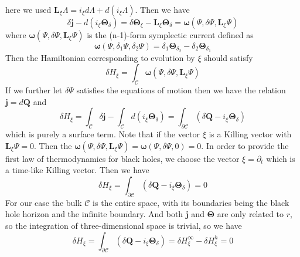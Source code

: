 \documentclass[a4paper,12pt]{article}
\numberwithin{equation}{section}
\begin{document}
\begin{appendix}
\begin{equation}
\end{equation}
here we used $\mathbf{L}_\xi \Lambda=i_\xi d\Lambda+d\left(i_\xi \Lambda\right)$. Then we have 
\begin{equation}
    \delta \mathbf{j}-d\left(i_\xi \mathbf{\Theta}_\delta\right)=\delta \mathbf{\Theta}_\xi -\mathbf{L}_\xi \mathbf{\Theta}_\delta=\mathbf{\omega}(\Psi,\delta\Psi,\mathbf{L}_\xi \Psi)
\end{equation}
where $\mathbf{\omega}(\Psi,\delta\Psi,\mathbf{L}_\xi \Psi)$ is the (n-1)-form symplectic current defined as \cite{Wald:1993nt,Iyer:1994ys}
\begin{equation}
    \mathbf{\omega}(\Psi,\delta_1\Psi,\delta_2\Psi)=\delta_1\mathbf{\Theta}_{\delta_2}-\delta_2\mathbf{\Theta}_{\delta_1}
\end{equation}
Then the Hamiltonian corresponding to evolution by $\xi$ should satisfy
\begin{equation}
    \delta H_{\xi}=\int_\mathcal{C}\mathbf{\omega}(\Psi,\delta\Psi,\mathbf{L}_\xi \Psi)
\end{equation}
If we further let $\delta \Psi$ satisfies the equations of motion then we have the relation $\mathbf{j}=d\mathbf{Q}$ and
\begin{equation}
    \delta H_{\xi}=\int_\mathcal{C}\delta\mathbf{j}-\int_\mathcal{C}d\left(i_\xi \mathbf{\Theta}_\delta\right)=\int_{\partial\mathcal{C}}\left(\delta\mathbf{Q}-i_\xi \mathbf{\Theta}_\delta\right)
\end{equation}
which is purely a surface term. Note that if the vector $\xi$ is a Killing vector with $\mathbf{L}_\xi \Psi=0$. Then the $\mathbf{\omega}(\Psi,\delta\Psi,\mathbf{L}_\xi \Psi)=\mathbf{\omega}(\Psi,\delta\Psi,0)=0$.
In order to provide the first law of thermodynamics for black holes, we choose the vector $\xi=\partial_t$ which is a time-like Killing vector. Then we have 
\begin{equation}
    \delta H_{\xi}=\int_{\partial\mathcal{C}}\left(\delta\mathbf{Q}-i_\xi \mathbf{\Theta}_\delta\right)=0
\end{equation}
For our case the bulk $\mathcal{C}$ is the entire space, with its boundaries being the black hole horizon and the infinite boundary. And both $\mathbf{j}$ and $\mathbf{\Theta}$ are only related to $r$, so the integration of three-dimensional space is trivial, so we have
 \begin{equation}
    \delta H_{\xi}=\int_{\partial\mathcal{C}}\left(\delta\mathbf{Q}-i_\xi \mathbf{\Theta}_\delta\right)=\delta H_{\xi}^{\infty}-\delta H_{\xi}^{h}=0
\end{equation}

\end{appendix}
\end{document}
